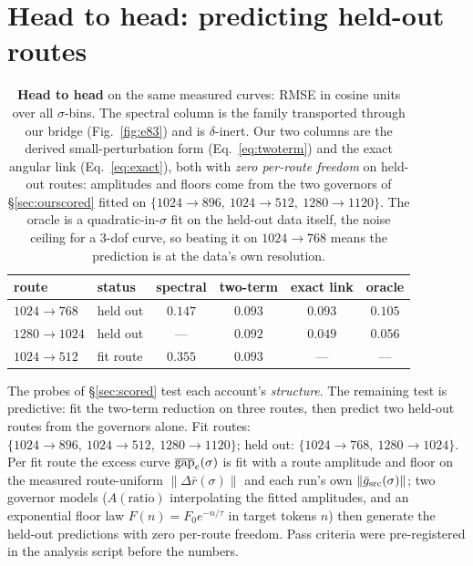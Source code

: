 \section{Head to head: predicting held-out routes}
\label{sec:headtohead}

\begin{table}[t]
\caption{\textbf{Head to head} on the same measured curves: RMSE in
cosine units over all $\sigma$-bins. The spectral column is the family
transported through our bridge (Fig.~\ref{fig:e83}) and is
$\delta$-inert. Our two columns are the derived small-perturbation form
(Eq.~\ref{eq:twoterm}) and the exact angular link (Eq.~\ref{eq:exact}),
both with \emph{zero per-route freedom} on held-out routes: amplitudes
and floors come from the two governors of \S\ref{sec:ourscored} fitted
on $\{1024{\to}896,\ 1024{\to}512,\ 1280{\to}1120\}$. The oracle is a
quadratic-in-$\sigma$ fit on the held-out data itself, the noise
ceiling for a 3-dof curve, so beating it on $1024{\to}768$ means the
prediction is at the data's own resolution.}
\label{tab:headtohead}
\centering
\small
\begin{tabular}{llcccc}
\toprule
route & status & spectral & two-term & exact link & oracle \\
\midrule
$1024{\to}768$ & held out & $0.147$ & $0.093$ & $0.093$ & $0.105$ \\
$1280{\to}1024$ & held out & --- & $0.092$ & $\mathbf{0.049}$ & $0.056$ \\
$1024{\to}512$ & fit route & $0.355$ & $0.093$ & --- & --- \\
\bottomrule
\end{tabular}
\end{table}

The probes of \S\ref{sec:scored} test each account's \emph{structure}. The remaining
test is predictive: fit the two-term reduction on three routes, then
predict two held-out routes from the governors alone. Fit routes:
$\{1024{\to}896,\ 1024{\to}512,\ 1280{\to}1120\}$; held out:
$\{1024{\to}768,\ 1280{\to}1024\}$. Per fit route the excess curve
$\overline{\mathrm{gap}}_e(\sigma)$ is fit with a route amplitude and floor on the
measured route-uniform $\|\Delta \bar r(\sigma)\|$ and each run's own
$\|\bar g_{\mathrm{src}}(\sigma)\|$; two governor models ($A(\mathrm{ratio})$
interpolating the fitted amplitudes, and an exponential floor law
$F(n) = F_0 e^{-n/\tau}$ in target tokens $n$) then generate the
held-out predictions with zero per-route freedom. Pass criteria were
pre-registered in the analysis script before the numbers.

